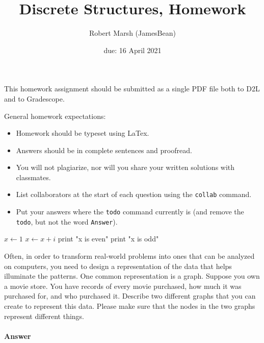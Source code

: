 \documentclass{article}
\title{Discrete Structures, Homework \hwnum}
\author{Robert Marsh (JamesBean)}
\date{due: 16 April 2021}
\begin{document}
\maketitle

This homework assignment should be
submitted as a single PDF file both to D2L and to Gradescope.

General homework expectations:
\begin{itemize}
    \item Homework should be typeset using LaTex.
    \item Answers should be in complete sentences and proofread.
    \item You will not plagiarize, nor will you share your written solutions
        with classmates.
    \item List collaborators at the start of each question using the \texttt{collab} command.
    \item Put your answers where the \texttt{todo} command currently is (and
        remove the \texttt{todo}, but not the word \texttt{Answer}).
\end{itemize}

\begin{algorithm}
    \begin{algorithmic}
      \State $x \gets 1$
        \State $x \gets x+i$
        \State print "x is even"
      \Else
        \State print "x is odd"
      \EndIf
      \EndFor
    \end{algorithmic}
\end{algorithm}  


\collab{} 

Often, in order to transform real-world problems into ones that can be analyzed
on computers, you need to design a representation of the data that helps
illuminate the patterns.  One common representation is a graph.  Suppose you own
a movie store.  You have records of every movie purchased, how much it was
purchased for, and who purchased it.  Describe two different graphs that you can
create to represent this data.  Please make sure that the nodes in the two
graphs represent different things.

\paragraph{Answer}
\end{document}
